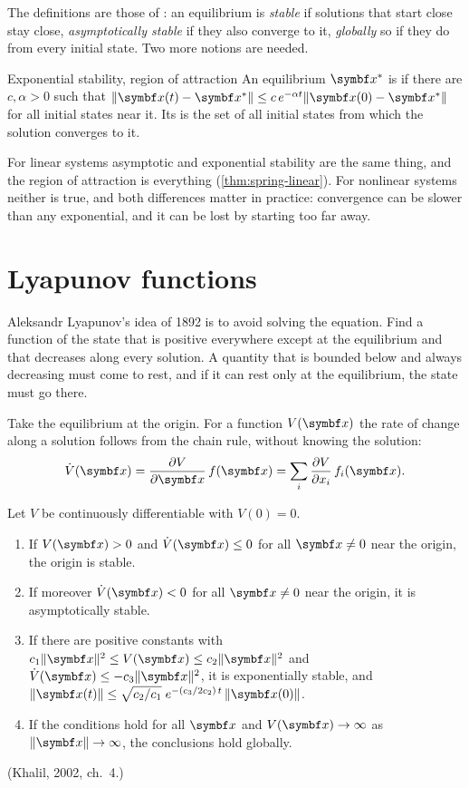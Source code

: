 The definitions are those of : an equilibrium is \emph{stable} if solutions that start close stay close, \emph{asymptotically stable} if they also converge to it, \emph{globally} so if they do from every initial state. Two more notions are needed.

\begin{definition}{Exponential stability, region of attraction}
An equilibrium $\vx^*$ is  if there are $c, \alpha > 0$ such that $\|\vx(t) - \vx^*\| \le c\,e^{-\alpha t}\|\vx(0) - \vx^*\|$ for all initial states near it. Its  is the set of all initial states from which the solution converges to it.
\end{definition}

For linear systems asymptotic and exponential stability are the same thing, and the region of attraction is everything (\cref{thm:spring-linear}). For nonlinear systems neither is true, and both differences matter in practice: convergence can be slower than any exponential, and it can be lost by starting too far away.

\section{Lyapunov functions}

Aleksandr Lyapunov's idea of 1892 is to avoid solving the equation. Find a function of the state that is positive everywhere except at the equilibrium and that decreases along every solution. A quantity that is bounded below and always decreasing must come to rest, and if it can rest only at the equilibrium, the state must go there.

Take the equilibrium at the origin. For a function $V(\vx)$ the rate of change along a solution follows from the chain rule, without knowing the solution:
\begin{equation}\label{eq:G-vdot}
  \dot V(\vx) = \frac{\partial V}{\partial\vx}\,f(\vx) = \sum_i \frac{\partial V}{\partial x_i}\,f_i(\vx) .
\end{equation}

\begin{theorem}
\label{thm:G-lyap}
Let $V$ be continuously differentiable with $V(0) = 0$.
\begin{enumerate}[label=(\roman*)]
  \item If $V(\vx) > 0$ and $\dot V(\vx) \le 0$ for all $\vx \ne 0$ near the origin, the origin is stable.
  \item If moreover $\dot V(\vx) < 0$ for all $\vx \ne 0$ near the origin, it is asymptotically stable.
  \item If there are positive constants with $c_1\|\vx\|^2 \le V(\vx) \le c_2\|\vx\|^2$ and $\dot V(\vx) \le -c_3\|\vx\|^2$, it is exponentially stable, and $\|\vx(t)\| \le \sqrt{c_2/c_1}\;e^{-(c_3/2c_2)\,t}\,\|\vx(0)\|$.
  \item If the conditions hold for all $\vx$ and $V(\vx) \to \infty$ as $\|\vx\| \to \infty$, the conclusions hold globally.
\end{enumerate}
(Khalil, 2002, ch.~4.)
\end{theorem}

